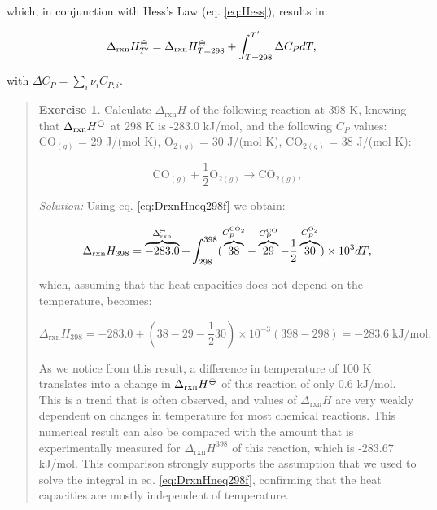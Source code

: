 \documentclass[
]{book}
\theoremstyle{definition}
\theoremstyle{definition}
\theoremstyle{definition}
\newtheorem{exercise}{Exercise}[chapter]
\theoremstyle{remark}
\begin{document}
which, in conjunction with Hess's Law (eq. \eqref{eq:Hess}), results in:

\begin{equation}
 \Delta_{\text{rxn}} H_{T'}^{-\kern-6pt{\ominus}\kern-6pt-}= \Delta_{\text{rxn}} H_{T=298}^{-\kern-6pt{\ominus}\kern-6pt-}+ \int_{T=298}^{T'} \Delta C_P dT,
  \label{eq:DrxnHneq298f}
\end{equation}

with \(\Delta C_P = \sum_i \nu_i C_{P,i}\).

\begin{quote}
\begin{exercise}
\protect\hypertarget{exr:DHtdiff298}{}{\label{exr:DHtdiff298} }Calculate \(\Delta_{\text{rxn}}H\) of the following reaction at 398 K, knowing that \(\Delta_{\text{rxn}}H^{-\kern-6pt{\ominus}\kern-6pt-}\) at 298 K is -283.0 kJ/mol, and the following \(C_P\) values: \(\mathrm{CO}_{(g)}\) = 29 J/(mol K), \(\mathrm{O}_{2(g)}\) = 30 J/(mol K), \(\mathrm{CO}_{2(g)}\) = 38 J/(mol K):

\[
\mathrm{CO}_{(g)}+\frac{1}{2}\mathrm{O}_{2(g)} \rightarrow \mathrm{CO}_{2(g)},
\]

\emph{Solution:} Using eq. \eqref{eq:DrxnHneq298f} we obtain:

\[
 \Delta_{\text{rxn}} H_{398} = \overbrace{-283.0}^{\Delta_{\text{rxn}}^{-\kern-6pt{\ominus}\kern-6pt-}} + \int_{298}^{398} ( \overbrace{38}^{C_P^{\mathrm{CO}_2}} -\overbrace{29}^{C_P^{\mathrm{CO}}} -\frac{1}{2}\overbrace{30}^{C_P^{\mathrm{O}_2}} ) \times 10^{3} dT,
\]

which, assuming that the heat capacities does not depend on the temperature, becomes:

\[
 \Delta_{\text{rxn}} H_{398} = -283.0 + \left(38-29-\frac{1}{2}30 \right) \times 10^{-3} (398-298) = -283.6 \; \text{kJ/mol}.
\]

As we notice from this result, a difference in temperature of 100 K translates into a change in \(\Delta_{\text{rxn}}H^{-\kern-6pt{\ominus}\kern-6pt-}\) of this reaction of only 0.6 kJ/mol. This is a trend that is often observed, and values of \(\Delta_{\text{rxn}}H\) are very weakly dependent on changes in temperature for most chemical reactions. This numerical result can also be compared with the amount that is experimentally measured for \(\Delta_{\text{rxn}}H^{398}\) of this reaction, which is -283.67 kJ/mol. This comparison strongly supports the assumption that we used to solve the integral in eq. \eqref{eq:DrxnHneq298f}, confirming that the heat capacities are mostly independent of temperature.
\end{exercise}
\end{quote}
\end{document}
